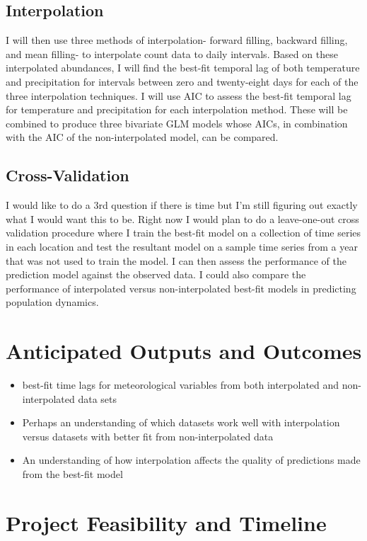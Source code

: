 \documentclass[11pt, a4paper]{article}
\begin{document}
\subsection{Interpolation}
I will then use three methods of interpolation- forward filling, backward filling, and mean filling- to interpolate count data to daily intervals. Based on these interpolated abundances, I will find the best-fit temporal lag of both temperature and precipitation for intervals between zero and twenty-eight days for each of the three interpolation techniques. I will use AIC to assess the best-fit temporal lag for temperature and precipitation for each interpolation method. These will be combined to produce three bivariate GLM models whose AICs, in combination with the AIC of the non-interpolated model, can be compared.

\subsection{Cross-Validation}  
I would like to do a 3rd question if there is time but I'm still figuring out exactly what I would want this to be. Right now I would plan to do a leave-one-out cross validation procedure where I train the best-fit model on a collection of time series in each location and test the resultant model on a sample time series from a year that was not used to train the model. I can then assess the performance of the prediction model against the observed data. I could also compare the performance of interpolated versus non-interpolated best-fit models in predicting population dynamics.

\section{Anticipated Outputs and Outcomes}

\begin{itemize}
	\item best-fit time lags for meteorological variables from both interpolated and non-interpolated data sets
	\item Perhaps an understanding of which datasets work well with interpolation versus datasets with better fit from non-interpolated data
	\item An understanding of how interpolation affects the quality of predictions made from the best-fit model
	
\end{itemize}

\section{Project Feasibility and Timeline}
\end{document}
